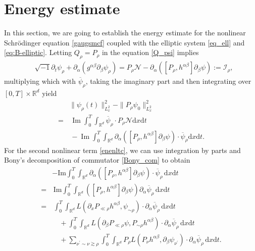 \documentclass[11pt,letterpaper,reqno]{amsart}
\numberwithin{equation}{section}
\theoremstyle{definition}
\theoremstyle{remark}
\newcommand{\pa}{\partial}
\begin{document}
\section{Energy estimate}\label{secEn}

In this section, we are going to establish the energy estimate for the nonlinear Schr\"odinger equation \eqref{gaugsmcf} coupled with the elliptic system  \eqref{eq_ell} and \eqref{eq:B-elliptic}. Letting  $ Q_\rho = P_\rho $ in the equation \eqref{Q_psi} implies
\begin{align} \label{Plamdeq}
	&\sqrt{-1} \pa_t \psi_{\rho} +  \partial_{ \alpha} (g^{\alpha \beta}  \partial_{ \beta} \psi_{\rho} ) =P_{\rho} \mathcal{N}- \partial_{ \alpha}  ([P_{\rho}, h^{\alpha \beta}]  \partial_{ \beta}\psi   ):= \mathcal{I}_\rho,
\end{align}
 multiplying which with $ \overline{\psi}_{\rho} $, taking the imaginary part and then integrating over $ [0,T]\times \mathbb{R}^d $ yield
\begin{align}
	&\|\psi_\rho(t)\|^2_{L^2_x} - \|P_\rho\psi_0\|^2_{L^2_x}\nonumber\\
	=&\,  \operatorname{Im}\int_0^T \int_{\mathbb{R}^{d}}  \overline{\psi}_{\rho}\cdot  P_{\rho} \mathcal{N}    \mathrm{ d} x \mathrm{ d} t \label{enenltn}\\
	&\,- \operatorname{Im}\int_0^T   \int_{\mathbb{R}^{d}}    \partial_{\alpha}( [P_{\rho}, h^{\alpha\beta}] \partial_{ \beta} \psi)  \cdot \overline{\psi}_{\rho}    \mathrm{ d} x \mathrm{ d} t. \label{enenltc}
\end{align}
For the second nonlinear term \eqref{enenltc},  we can use  integration by parts and Bony's decomposition of commutator \eqref{Bony_com} to obtain
\begin{align}
	&- \mathrm{Im}\int_0^T \int_{\mathbb{R}^{d}}   \partial_{\alpha} ( [P_{\rho}, h^{\alpha\beta}] \partial_{ \beta} \psi  ) \cdot \overline{\psi}_{\rho} \,  \mathrm{ d} x\mathrm{ d} t\nonumber\\
	= &\,\mathrm{Im}\int_0^T \int_{\mathbb{R}^{d}}    ( [P_{\rho}, h^{\alpha \beta} ] \partial _{\beta} \psi ) \partial _{\alpha} \overline{\psi}_{\rho} \,  \mathrm{ d} x\mathrm{ d} t\nonumber\\
	=   &\,\int_0^T \int_{\mathbb{R}^{d}} L ( \partial_x P_{\ll \rho }  h^{\alpha \beta},   \psi_{\sim \rho })\cdot \partial_{\alpha} \overline{\psi}_{\rho} \,\mathrm{ d} x\mathrm{ d} t\label{ene_ht1}\\
	&\quad +    \int_0^T \int_{\mathbb{R}^{d}} L (\partial_{ \beta} P_{\ll \rho  }   \psi, P_{\sim \rho } h^{ \alpha \beta})\cdot \partial_{\alpha} \overline{\psi}_{\rho}\, \mathrm{ d} x\mathrm{ d} t\label{ene_ht2}\\
	&\quad +\sum_{\nu^{\prime} \sim \nu \gtrsim \rho }  \int_0^T \int_{\mathbb{R}^{d}} P_{\rho} L( P_{\nu} h^{\alpha \beta},  \partial _{ \beta}   
 \psi_{\nu^\prime })\cdot\partial _{\alpha} \overline{\psi}_{\rho} \,\mathrm{ d} x\mathrm{ d} t\label{ene_ht3}.
\end{align}
\end{document}
